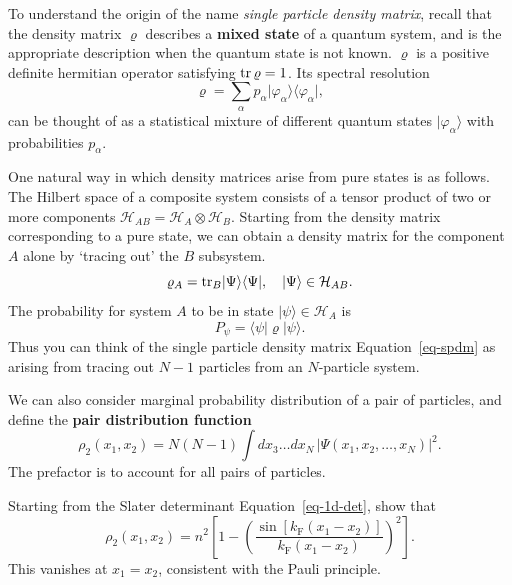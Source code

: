 \documentclass[
  a4paper,
]{scrbook}
\begin{document}
\begin{tcolorbox}[enhanced jigsaw, rightrule=.15mm, opacityback=0, bottomtitle=1mm, colbacktitle=quarto-callout-note-color!10!white, colback=white, toprule=.15mm, titlerule=0mm, arc=.35mm, title=\textcolor{quarto-callout-note-color}{\faInfo}\hspace{0.5em}{Note}, left=2mm, opacitybacktitle=0.6, breakable, leftrule=.75mm, bottomrule=.15mm, colframe=quarto-callout-note-color-frame, toptitle=1mm, coltitle=black]

To understand the origin of the name \emph{single particle density
matrix}, recall that the density matrix \(\varrho\) describes a
\textbf{mixed state} of a quantum system, and is the appropriate
description when the quantum state is not known. \(\varrho\) is a
positive definite hermitian operator satisfying \(\operatorname{tr} \varrho =1\). Its
spectral resolution \[
\varrho = \sum_\alpha p_\alpha \lvert{\varphi_\alpha}\rangle\langle{\varphi_\alpha}\rvert,
\] can be thought of as a statistical mixture of different quantum
states \(\lvert{\varphi_\alpha}\rangle\) with probabilities
\(p_\alpha\).

One natural way in which density matrices arise from pure states is as
follows. The Hilbert space of a composite system consists of a tensor
product of two or more components
\(\mathcal{H}_{AB} = \mathcal{H}_A \otimes \mathcal{H}_B\). Starting
from the density matrix corresponding to a pure state, we can obtain a
density matrix for the component \(A\) alone by `tracing out' the \(B\)
subsystem. \[
\varrho_A = \operatorname{tr}_B \lvert{\Psi}\rangle\langle{\Psi}\rvert,\quad \lvert{\Psi}\rangle\in \mathcal{H}_{AB}.
\] The probability for system \(A\) to be in state
\(\lvert{\psi}\rangle\in \mathcal{H}_A\) is \[
P_\psi = \langle{\psi}\rvert\varrho\lvert{\psi}\rangle.
\] Thus you can think of the single particle density matrix
Equation~\ref{eq-spdm} as arising from tracing out \(N-1\) particles
from an \(N\)-particle system.

We can also consider marginal probability distribution of a pair of
particles, and define the \textbf{pair distribution function} \[
\rho_2(x_1,x_2) = N(N-1) \int dx_3\ldots dx_N \,\left|\Psi(x_1,x_2,\ldots,x_N)\right|^2.
\] The prefactor is to account for all pairs of particles.

\end{tcolorbox}

\begin{tcolorbox}[enhanced jigsaw, rightrule=.15mm, opacityback=0, bottomtitle=1mm, colbacktitle=quarto-callout-tip-color!10!white, colback=white, toprule=.15mm, titlerule=0mm, arc=.35mm, title=\textcolor{quarto-callout-tip-color}{\faLightbulb}\hspace{0.5em}{Check}, left=2mm, opacitybacktitle=0.6, breakable, leftrule=.75mm, bottomrule=.15mm, colframe=quarto-callout-tip-color-frame, toptitle=1mm, coltitle=black]

Starting from the Slater determinant Equation~\ref{eq-1d-det}, show that
\[
\rho_2(x_1,x_2) = n^2\left[1 - \left(\frac{\sin\left[k_\text{F}(x_1-x_2)\right]}{k_\text{F}(x_1-x_2)}\right)^2\right].
\] This vanishes at \(x_1=x_2\), consistent with the Pauli principle.

\end{tcolorbox}
\end{document}
